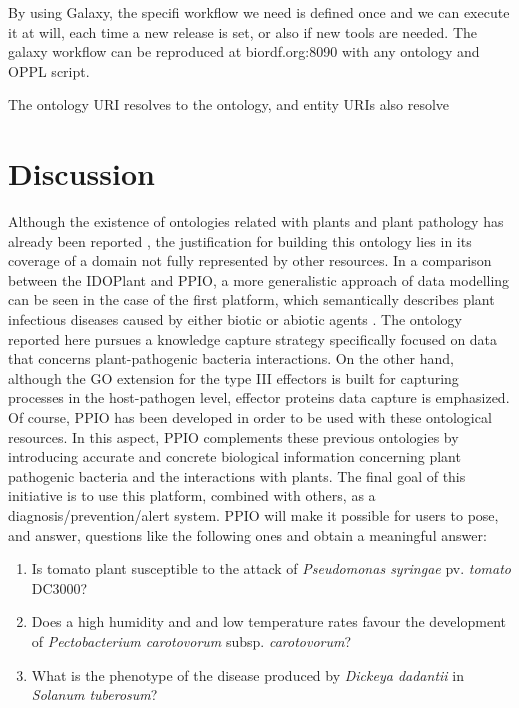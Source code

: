 \documentclass[sw]{iosart2c}
\begin{document}
By using Galaxy, the specifi workflow we need is defined once and we can execute it at will, each time a new release is set, or also if new tools are needed. The galaxy workflow can be reproduced at biordf.org:8090 with any ontology and OPPL script.

The ontology URI resolves to the ontology, and entity URIs also resolve 



\section{Discussion}

Although the existence of ontologies related with plants and plant pathology has already been reported \cite{PTO} \cite{Lindeberg} \cite{Walls}, the justification for building this ontology lies in its coverage of a domain not fully represented by other resources. In a comparison between the IDOPlant and PPIO, a more generalistic approach of data modelling can be seen in the case of the first platform, which semantically describes plant infectious diseases caused by either biotic or abiotic agents . The ontology reported here pursues a knowledge capture strategy specifically focused on data that concerns plant-pathogenic bacteria interactions. On the other hand, although the GO extension for the type III effectors is built for capturing processes in the host-pathogen level, effector proteins data capture is emphasized. Of course, PPIO has been developed in order to be used with these ontological resources. In this aspect, PPIO complements these previous ontologies by introducing accurate and concrete biological information concerning plant pathogenic bacteria and the interactions with plants. The final goal of this initiative is to use this platform, combined with others, as a diagnosis/prevention/alert system. PPIO will make it possible for users to pose, and answer, questions like the following ones and obtain a meaningful answer:

\begin{enumerate}
\item Is tomato plant susceptible to the attack of {\itshape Pseudomonas syringae} pv. {\itshape tomato} DC3000?
\item Does a high humidity and and low temperature rates favour the development of {\itshape Pectobacterium carotovorum} subsp. {\itshape carotovorum}?
\item What is the phenotype of the disease produced by {\itshape Dickeya dadantii} in {\itshape Solanum tuberosum}?

\end{enumerate}
\end{document}

